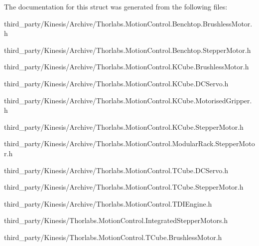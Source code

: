 The documentation for this struct was generated from the following files\+:\begin{DoxyCompactItemize}
\item 
third\+\_\+party/\+Kinesis/\+Archive/Thorlabs.\+Motion\+Control.\+Benchtop.\+Brushless\+Motor.\+h\item 
third\+\_\+party/\+Kinesis/\+Archive/Thorlabs.\+Motion\+Control.\+Benchtop.\+Stepper\+Motor.\+h\item 
third\+\_\+party/\+Kinesis/\+Archive/Thorlabs.\+Motion\+Control.\+K\+Cube.\+Brushless\+Motor.\+h\item 
third\+\_\+party/\+Kinesis/\+Archive/Thorlabs.\+Motion\+Control.\+K\+Cube.\+D\+C\+Servo.\+h\item 
third\+\_\+party/\+Kinesis/\+Archive/Thorlabs.\+Motion\+Control.\+K\+Cube.\+Motorised\+Gripper.\+h\item 
third\+\_\+party/\+Kinesis/\+Archive/Thorlabs.\+Motion\+Control.\+K\+Cube.\+Stepper\+Motor.\+h\item 
third\+\_\+party/\+Kinesis/\+Archive/Thorlabs.\+Motion\+Control.\+Modular\+Rack.\+Stepper\+Motor.\+h\item 
third\+\_\+party/\+Kinesis/\+Archive/Thorlabs.\+Motion\+Control.\+T\+Cube.\+D\+C\+Servo.\+h\item 
third\+\_\+party/\+Kinesis/\+Archive/Thorlabs.\+Motion\+Control.\+T\+Cube.\+Stepper\+Motor.\+h\item 
third\+\_\+party/\+Kinesis/\+Archive/Thorlabs.\+Motion\+Control.\+T\+D\+I\+Engine.\+h\item 
third\+\_\+party/\+Kinesis/Thorlabs.\+Motion\+Control.\+Integrated\+Stepper\+Motors.\+h\item 
third\+\_\+party/\+Kinesis/Thorlabs.\+Motion\+Control.\+T\+Cube.\+Brushless\+Motor.\+h\end{DoxyCompactItemize}
